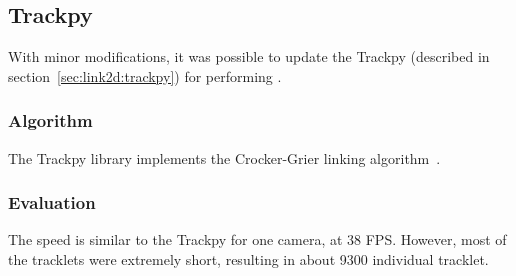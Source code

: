 \subsection{Trackpy}
\label{sec:link3d:trackpy}

With minor modifications, it was possible to update the Trackpy \linkDD* (described in section~\ref{sec:link2d:trackpy}) for performing \linkDDD*.

\subsubsection{Algorithm}

The Trackpy library implements the Crocker-Grier linking algorithm~\cite{trackpy-link}.

\subsubsection{Evaluation}

The speed is similar to the Trackpy \linkDD* for one camera, at 38 FPS.
However, most of the tracklets were extremely short, resulting in about 9300 individual tracklet.
